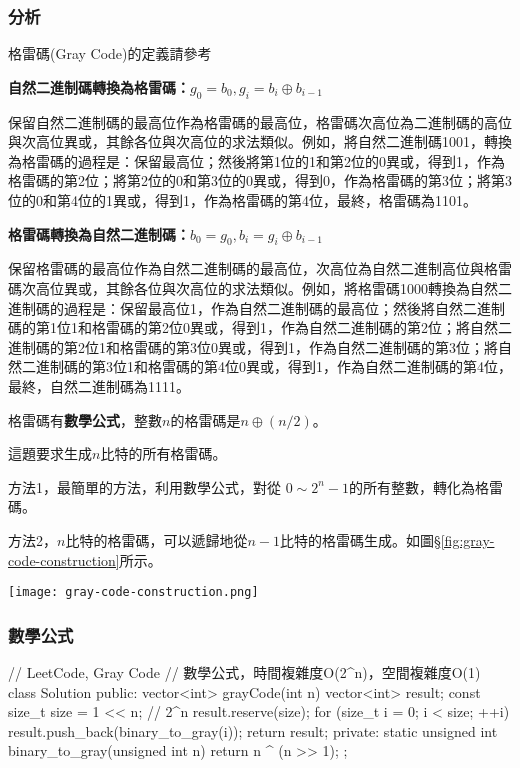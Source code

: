 \subsubsection{分析}
格雷碼(Gray Code)的定義請參考 

\textbf{自然二進制碼轉換為格雷碼：$g_0=b_0, g_i=b_i \oplus b_{i-1}$}

保留自然二進制碼的最高位作為格雷碼的最高位，格雷碼次高位為二進制碼的高位與次高位異或，其餘各位與次高位的求法類似。例如，將自然二進制碼1001，轉換為格雷碼的過程是：保留最高位；然後將第1位的1和第2位的0異或，得到1，作為格雷碼的第2位；將第2位的0和第3位的0異或，得到0，作為格雷碼的第3位；將第3位的0和第4位的1異或，得到1，作為格雷碼的第4位，最終，格雷碼為1101。

\textbf{格雷碼轉換為自然二進制碼：$b_0=g_0, b_i=g_i \oplus b_{i-1}$}

保留格雷碼的最高位作為自然二進制碼的最高位，次高位為自然二進制高位與格雷碼次高位異或，其餘各位與次高位的求法類似。例如，將格雷碼1000轉換為自然二進制碼的過程是：保留最高位1，作為自然二進制碼的最高位；然後將自然二進制碼的第1位1和格雷碼的第2位0異或，得到1，作為自然二進制碼的第2位；將自然二進制碼的第2位1和格雷碼的第3位0異或，得到1，作為自然二進制碼的第3位；將自然二進制碼的第3位1和格雷碼的第4位0異或，得到1，作為自然二進制碼的第4位，最終，自然二進制碼為1111。

格雷碼有\textbf{數學公式}，整數$n$的格雷碼是$n \oplus (n/2)$。

這題要求生成$n$比特的所有格雷碼。

方法1，最簡單的方法，利用數學公式，對從 $0\sim2^n-1$的所有整數，轉化為格雷碼。

方法2，$n$比特的格雷碼，可以遞歸地從$n-1$比特的格雷碼生成。如圖\S \ref{fig:gray-code-construction}所示。

\begin{center}
\texttt{[image: gray-code-construction.png]}\\
\label{fig:gray-code-construction}
\end{center}


\subsubsection{數學公式}
\begin{Code}
// LeetCode, Gray Code
// 數學公式，時間複雜度O(2^n)，空間複雜度O(1)
class Solution {
public:
    vector<int> grayCode(int n) {
        vector<int> result;
        const size_t size = 1 << n;  // 2^n
        result.reserve(size);
        for (size_t i = 0; i < size; ++i)
            result.push_back(binary_to_gray(i));
        return result;
    }
private:
    static unsigned int binary_to_gray(unsigned int n) {
        return n ^ (n >> 1);
    }
};
\end{Code}


